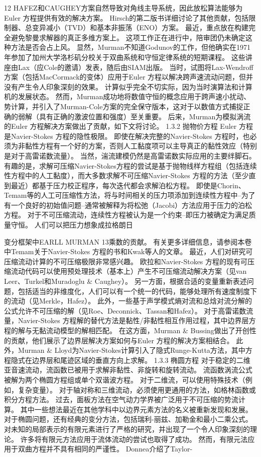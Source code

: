 \documentclass[UTF8,11pt,a4paper,openany,fontset=fandol]{ctexbook}
\begin{document}
12 HAFEZ和CAUGHEY方案自然导致对角线主导系统，因此放松算法能够为Euler 方程提供有效的解决方案。 Hirsch的第二版书详细讨论了其他贡献，包括限制器、总变异减小（TVD）和基本非振荡（ENO）方案。 最近，重点放在构建完全避免黎曼求解器的真正多维方案上。 这项工作正在进行中，陪审团仍未确定这种方法是否会占上风。 显然，Murman不知道Godunov的工作，但他确实在1971年参加了加州大学洛杉矶分校关于双曲系统和守恒定律系统的短期课程。 这些讲座由Lax（应Cole的邀请）发表，随后由SIAM出版。 当时，试图将Lax-Wendroff方案（包括MacCormack的变体）应用于Euler 方程以解决跨声速流动问题，但并没有产生令人印象深刻的效果。 计算似乎完全不切实际，因为当时演算法和计算机的发展状态。 然而，Murman成功地将数值守恒的概念应用于跨声速小扰动、势计算，并引入了Murman-Cole方案的完全保守版本，这对于以数值方式捕捉正确的弱解（具有正确的激波位置和强度）至关重要。 后来，Murman为模拟涡流的Euler 方程解决方案做出了贡献，如下文将讨论。 1.3.2 抛物价方程 Euler 方程是Navier-Stokes 方程的隐性极限。 即使在解决完整的Navier-Stokes 方程时，也必须为非黏性方程有一个好的方案，否则人工黏度项可以主导真正的黏性效应（特别是对于高雷诺数流量）。 当然，湍流建模仍然是高雷诺数实际应用的主要绊脚石。 有趣的是，求解可压缩Navier-Stokes方程的尝试是基于抛物线样方程组（包括连续性方程中的人工黏度），而大多数求解不可压缩Navier-Stokes 方程的方法（至少直到最近）都基于压力校正程序，每次迭代都会求解泊松方程。 即使是Chorin、Temam等的人工可压缩性方法，将与时间相关的压力项添加到连续性方程中--为了有一个良好的初始值问题--通常被解释为将松弛（Jacobi）方法应用于压力的泊松方程。 对于不可压缩流动，连续性方程被认为是一个约束--即压力被确定为满足质量守恒。 人们可以把压力想象成拉格朗日

变分框架中EARLL MURMAN 13乘数的贡献。 有关更多详细信息，请参阅本卷中Temam关于Navier-Stokes 方程的书和Kwak等人的文章。 最近，人们对研究可压缩流动计算的不可压缩极限非常感兴趣。 欧拉和Navier-Stokes 方程的现有可压缩流动代码可以使用预处理技术（基本上）产生不可压缩流动解决方案（见van Leer、Turkel和Muradoglu \& Caughey）。 另一方面，根据合适的变量重新表述问题，包括适当的非维度化，人们可以有一个统一的代码，能够处理所有速度制度下的流动（见Merkle，Hafez）。 此外，一些基于声学模式熵对流和总焓对流分解的公式允许不可压缩的解（见Roe、Deconnick、Tassan和Hafez）。 对于高雷诺数流量，Navier-Stokes 方程解的替代方法是黏性/非黏性相互作用过程，其中边界层方程的解与无黏流动模型的解相匹配。 在这方面，Murman \& Bussing做出了开创性的贡献，他们展示了边界层解决方案如何与Euler 方程的解决方案相结合。 此外，Murman \& Lloyd为Navier-Stokes计算引入了隐式Runge-Kutta方法，其中方程隐式在边界层和尾迹区域的垂直方向上求解。 1.3.3 椭圆方程 对于稳定的二维亚音速流动，流函数已被用于求解非黏性、非旋转和旋转流动。 流函数涡流公式被解为两个椭圆方程组或单个双谐波方程。 对于二维流，可以使用特殊技术（例如，复杂变量）。 对于轴对称和三维流动，必须使用更通用的方法，如格林函数或积分方程方法。 过去，面板方法在空气动力学界被广泛用于不可压缩的势流计算。 其中一些想法最近在其他学科中以边界元素方法的名义被重新发现和发展。 对于椭圆问题，还有经典的变分方法，包括瑞利-丽兹、加勒金和最小二乘公式。 对未知的局部表示的有限元素进行了严格的研究，并出现了一个令人印象深刻的理论。 许多将有限元方法应用于流体流动的尝试也取得了成功。 然而，有限元法应用于双曲方程并不具有相同的严谨性。 Donnea介绍了Taylor-
\end{document}
